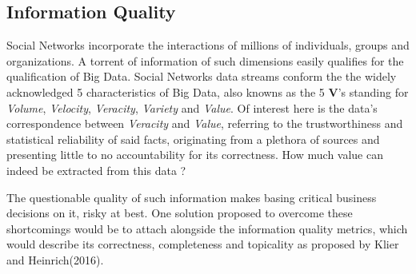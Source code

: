 	\subsection{Information Quality}
		Social Networks incorporate the interactions of millions of individuals, groups and organizations. A torrent of information of such dimensions easily qualifies for the qualification of Big Data. Social Networks data streams conform the the widely acknowledged 5 characteristics of Big Data, also knowns as the 5 \textbf{V}'s\cite{bigdata} standing for \textit{Volume}, \textit{Velocity}, \textit{Veracity}, \textit{Variety} and \textit{Value}. Of interest here is the data's correspondence between \textit{Veracity} and \textit{Value}, referring to the trustworthiness and statistical reliability of said facts, originating from a plethora of sources and presenting little to no accountability for its correctness. How much value can indeed be extracted from this data ?
		\par
		The questionable quality of such information makes basing critical business decisions on it, risky at best. One solution proposed to overcome these shortcomings would be to attach alongside the information quality metrics, which would describe its correctness, completeness and topicality as proposed by Klier and Heinrich(2016)\cite{klier2016datenqualitat}.